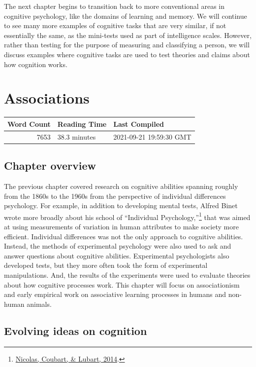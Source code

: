 \documentclass[
  oneside,
  12pt]{crumpbook}
\begin{document}
The next chapter begins to transition back to more conventional areas in cognitive psychology, like the domains of learning and memory. We will continue to see many more examples of cognitive tasks that are very similar, if not essentially the same, as the mini-tests used as part of intelligence scales. However, rather than testing for the purpose of measuring and classifying a person, we will discuss examples where cognitive tasks are used to test theories and claims about how cognition works.

\hypertarget{associations}{%
\chapter{Associations}\label{associations}}

\begin{tabular}{r|l|l}
\hline
Word Count & Reading Time & Last Compiled\\
\hline
7653 & 38.3 minutes & 2021-09-21 19:59:30 GMT\\
\hline
\end{tabular}

\hypertarget{chapter-overview-4}{%
\section{Chapter overview}\label{chapter-overview-4}}

The previous chapter covered research on cognitive abilities spanning roughly from the 1860s to the 1960s from the perspective of individual differences psychology. For example, in addition to developing mental tests, Alfred Binet wrote more broadly about his school of ``Individual Psychology,''\footnote{\protect\hyperlink{ref-nicolasProgramIndividualPsychology2014}{Nicolas, Coubart, \& Lubart, 2014}.} that was aimed at using measurements of variation in human attributes to make society more efficient. Individual differences was not the only approach to cognitive abilities. Instead, the methods of experimental psychology were also used to ask and answer questions about cognitive abilities. Experimental psychologists also developed tests, but they more often took the form of experimental manipulations. And, the results of the experiments were used to evaluate theories about how cognitive processes work. This chapter will focus on associationism and early empirical work on associative learning processes in humans and non-human animals.

\hypertarget{evolving-ideas-on-cognition}{%
\section{Evolving ideas on cognition}\label{evolving-ideas-on-cognition}}
\end{document}
